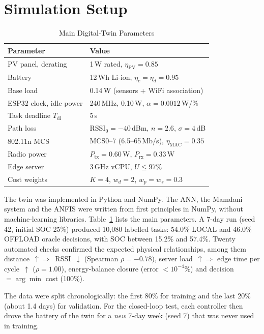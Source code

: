 \documentclass[conference]{IEEEtran}
\begin{document}
\section{Simulation Setup}
\begin{table}[t]
\caption{Main Digital-Twin Parameters}
\label{tab:params}
\centering
\footnotesize
\begin{tabular}{@{}ll@{}}
\toprule
Parameter & Value \\
\midrule
PV panel, derating & 1\,W rated, $\eta_{\mathrm{PV}}=0.85$ \\
Battery & 12\,Wh Li-ion, $\eta_c=\eta_d=0.95$ \\
Base load & 0.14\,W (sensors + WiFi association) \\
ESP32 clock, idle power & 240\,MHz, 0.10\,W, $\alpha=0.0012$\,W/\% \\
Task deadline $T_{\mathrm{dl}}$ & 5\,s \\
Path loss & $\mathrm{RSSI}_0=-40$\,dBm, $n=2.6$, $\sigma=4$\,dB \\
802.11n MCS & MCS0--7 (6.5--65\,Mb/s), $\eta_{\mathrm{MAC}}=0.35$ \\
Radio power & $P_{\mathrm{tx}}=0.60$\,W, $P_{\mathrm{rx}}=0.33$\,W \\
Edge server & 3\,GHz vCPU, $U\le 97\%$ \\
Cost weights & $K=4$, $w_d=2$, $w_p=w_s=0.3$ \\
\bottomrule
\end{tabular}
\end{table}

The twin was implemented in Python and NumPy. The ANN, the Mamdani system and the ANFIS were written from first principles in
NumPy, without machine-learning libraries. Table~\ref{tab:params} lists the main parameters. A 7-day run (seed 42, initial SOC 25\%)
produced 10{,}080 labelled tasks: 54.0\% LOCAL and 46.0\% OFFLOAD oracle decisions, with SOC between 15.2\% and 57.4\%. Twenty
automated checks confirmed the expected physical relationships, among them distance~$\uparrow\Rightarrow$~RSSI~$\downarrow$
(Spearman $\rho=-0.78$), server load~$\uparrow\Rightarrow$ edge time per cycle~$\uparrow$ ($\rho=1.00$), energy-balance closure
(error $<10^{-4}\%$) and decision $=\arg\min$ cost (100\%).

The data were split chronologically: the first 80\% for training and the last 20\% (about 1.4 days) for validation. For the
closed-loop test, each controller then drove the battery of the twin for a \emph{new} 7-day week (seed 7) that was never used
in training.
\end{document}
